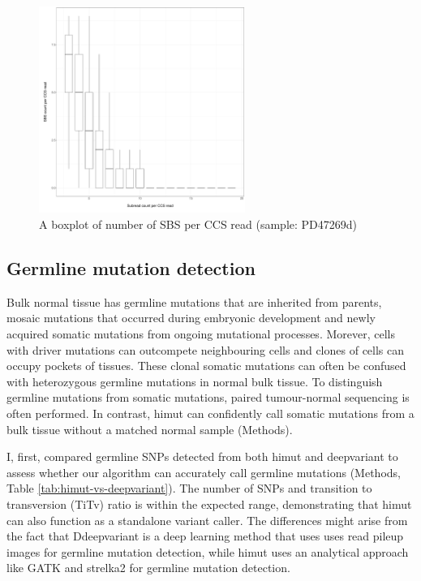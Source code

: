 \begin{figure}[htbp!]
\caption{A boxplot of number of SBS per CCS read (sample: PD47269d)}
\label{figure:sbs-count-per-ccs-read}
\begin{centering}
\includegraphics[width=0.6\textwidth]{Vector/sbs_count_per_ccs_read.pdf}
\end{centering}
\end{figure}

\subsection{Germline mutation detection}

Bulk normal tissue has germline mutations that are inherited from parents, mosaic mutations that occurred during embryonic development and newly acquired somatic mutations from ongoing mutational processes. Morever, cells with driver mutations can outcompete neighbouring cells and clones of cells can occupy pockets of tissues. These clonal somatic mutations can often be confused with heterozygous germline mutations in normal bulk tissue. To distinguish germline mutations from somatic mutations, paired tumour-normal sequencing is often performed. In contrast, himut can confidently call somatic mutations from a bulk tissue without a matched normal sample (Methods). 

I, first, compared germline SNPs detected from both himut and deepvariant to assess whether our algorithm can accurately call germline mutations (Methods, Table \ref{tab:himut-vs-deepvariant}). The number of SNPs and transition to transversion (TiTv) ratio is within the expected range, demonstrating that himut can also function as a standalone variant caller. The differences might arise from the fact that Ddeepvariant is a deep learning method that uses uses read pileup images for germline mutation detection, while himut uses an analytical approach like GATK and strelka2 \cite{Kim2018-qi, DePristo2011-vf}  for germline mutation detection. 

